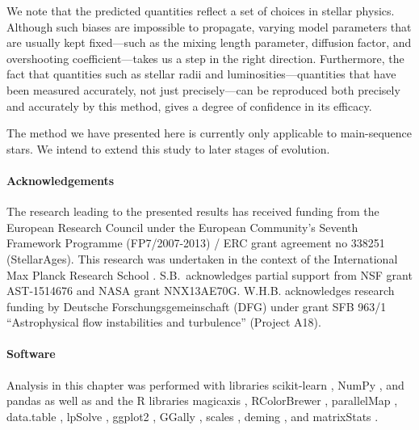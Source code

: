 We note that the predicted quantities reflect a set of choices in stellar physics. Although such biases are impossible to propagate, varying model parameters that are usually kept fixed---such as the mixing length parameter, diffusion  factor, and overshooting coefficient---takes us a step in the right direction. Furthermore, the fact that quantities such as stellar radii and luminosities---quantities that have been measured accurately, not just precisely---can be reproduced both precisely and accurately by this method, gives a degree of confidence in its efficacy. 

The method we have presented here is currently only applicable to main-sequence stars. We intend to extend this study to later stages of evolution. 


\paragraph*{Acknowledgements} 
\noindent The research leading to the presented results has received funding from the European Research Council under the European Community's Seventh Framework Programme (FP7/2007-2013) / ERC grant agreement no 338251 (StellarAges). This research was undertaken in the context of the International Max Planck Research School . S.B.\ acknowledges partial support from NSF grant AST-1514676 and NASA grant NNX13AE70G. W.H.B. acknowledges research funding by Deutsche Forschungsgemeinschaft (DFG) under grant SFB 963/1 ``Astrophysical flow instabilities and turbulence'' (Project A18).

\paragraph*{Software}
\noindent Analysis in this chapter was performed with  libraries scikit-learn  \citep{scikit-learn}, NumPy  \citep{van2011numpy}, and pandas  \citep{mckinney2010data} as well as  \citep{R} and the R libraries magicaxis  \citep{magicaxis}, RColorBrewer  \citep{RColorBrewer}, parallelMap  \citep{parallelMap}, data.table  \citep{data.table}, lpSolve  \citep{lpSolve}, ggplot2  \citep{ggplot2}, GGally  \citep{GGally}, scales  \citep{scales}, deming  \citep{deming}, and matrixStats  \citep{matrixStats}.

